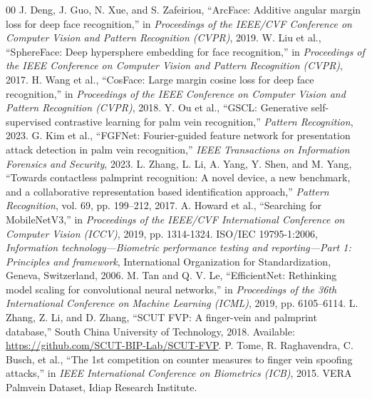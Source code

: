 \documentclass[12pt,a4paper]{article}
\begin{document}
\begin{thebibliography}{00}
 J. Deng, J. Guo, N. Xue, and S. Zafeiriou, ``ArcFace: Additive angular margin loss for deep face recognition,'' in \textit{Proceedings of the IEEE/CVF Conference on Computer Vision and Pattern Recognition (CVPR)}, 2019.
 W. Liu et al., ``SphereFace: Deep hypersphere embedding for face recognition,'' in \textit{Proceedings of the IEEE Conference on Computer Vision and Pattern Recognition (CVPR)}, 2017.
 H. Wang et al., ``CosFace: Large margin cosine loss for deep face recognition,'' in \textit{Proceedings of the IEEE Conference on Computer Vision and Pattern Recognition (CVPR)}, 2018.
 Y. Ou et al., ``GSCL: Generative self-supervised contrastive learning for palm vein recognition,'' \textit{Pattern Recognition}, 2023.
 G. Kim et al., ``FGFNet: Fourier-guided feature network for presentation attack detection in palm vein recognition,'' \textit{IEEE Transactions on Information Forensics and Security}, 2023.
 L. Zhang, L. Li, A. Yang, Y. Shen, and M. Yang, ``Towards contactless palmprint recognition: A novel device, a new benchmark, and a collaborative representation based identification approach,'' \textit{Pattern Recognition}, vol. 69, pp. 199--212, 2017.
 A. Howard et al., ``Searching for MobileNetV3,'' in \textit{Proceedings of the IEEE/CVF International Conference on Computer Vision (ICCV)}, 2019, pp. 1314-1324.
 ISO/IEC 19795-1:2006, \textit{Information technology---Biometric performance testing and reporting---Part 1: Principles and framework}, International Organization for Standardization, Geneva, Switzerland, 2006.
 M. Tan and Q. V. Le, ``EfficientNet: Rethinking model scaling for convolutional neural networks,'' in \textit{Proceedings of the 36th International Conference on Machine Learning (ICML)}, 2019, pp. 6105--6114.
 L. Zhang, Z. Li, and D. Zhang, ``SCUT FVP: A finger-vein and palmprint database,'' South China University of Technology, 2018. Available: \url{https://github.com/SCUT-BIP-Lab/SCUT-FVP}.
 P. Tome, R. Raghavendra, C. Busch, et al., ``The 1st competition on counter measures to finger vein spoofing attacks,'' in \textit{IEEE International Conference on Biometrics (ICB)}, 2015. VERA Palmvein Dataset, Idiap Research Institute.
\end{thebibliography}
\end{document}
